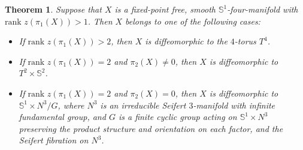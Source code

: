 \documentclass[11pt]{amsart}
\theoremstyle{plain}
\newtheorem{theorem}{Theorem}
\numberwithin{theorem}{section}
\theoremstyle{definition}
\begin{document}
\begin{theorem}
Suppose that $X$ is a fixed-point free, smooth ${{\mathbb S}}^1$-four-manifold with $\text{rank }z(\pi_1(X))>1$. 
Then $X$ belongs to one of the following cases:
\begin{itemize}
\item [{(1)}] If $\text{rank }z(\pi_1(X))>2$, then $X$ is diffeomorphic to the $4$-torus $T^4$.
\item [{(2)}] If $\text{rank }z(\pi_1(X))=2$ and $\pi_2(X)\neq 0$, then $X$ is diffeomorphic to 
$T^2\times {{\mathbb S}}^2$.
\item [{(3)}] If $\text{rank }z(\pi_1(X))=2$ and $\pi_2(X)=0$, then $X$ is diffeomorphic to 
${{\mathbb S}}^1\times N^3/G$, where $N^3$ is an irreducible Seifert $3$-manifold with infinite fundamental group, and $G$ is a finite cyclic group acting on ${{\mathbb S}}^1\times N^3$ preserving the product structure and orientation on each factor, and the Seifert fibration on $N^3$.
\end{itemize}
\end{theorem}
\end{document}
